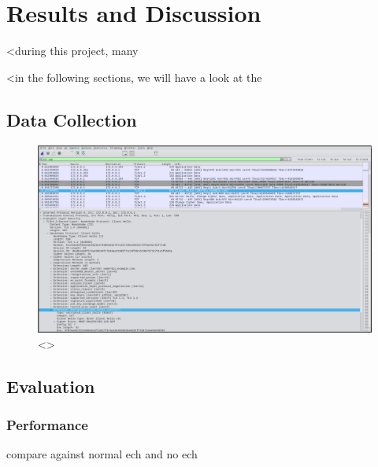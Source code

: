 \chapter{Results and Discussion}\label{Results}

\blindtext
<during this project, many 

<in the following sections, we will have a look at the 









\section{Data Collection}

\blindtext

\begin{figure}[ht]
\centerline{\includegraphics[width=120mm]{images/wireshark.png}}
\caption[TODO wireshark]{<>}
\label{wireshark_screenshot_figure}
\end{figure}









\section{Evaluation}

\blindtext

\subsection{Performance}

compare against normal ech and no ech
\blindtext

